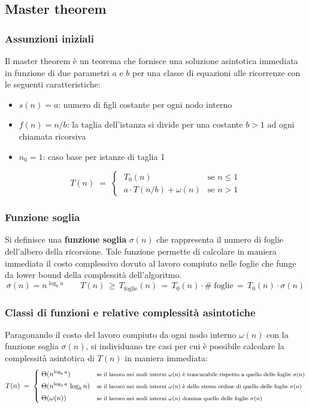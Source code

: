 \subsection{Master theorem}
\subsubsection*{Assunzioni iniziali}
Il master theorem è un teorema che fornisce una soluzione asintotica immediata in funzione di due parametri \(a\) e \(b\)
per una classe di equazioni alle ricorrenze con le seguenti caratteristiche:
\begin{itemize}
	\item \(s(n) = a\): numero di figli costante per ogni nodo interno
	\item \(f(n) = n/b\): la taglia dell'istanza si divide per una costante \(b > 1\) ad ogni chiamata ricorsiva
	\item \(n_0 = 1\): caso base per istanze di taglia 1
\end{itemize}

\[T(n) \; = \; \begin{cases}
	\; T_0(n) & \text{se } n \leq 1 \\[3pt]
	\; a \cdot T(n/b) + \omega(n) & \text{se } n > 1
\end{cases}\]

\subsubsection*{Funzione soglia}
Si definisce una \textbf{funzione soglia} \(\sigma(n)\) che rappresenta il numero di foglie dell'albero della ricorsione.
Tale funzione permette di calcolare in maniera immediata il costo complessivo dovuto al lavoro compiuto nelle foglie che
funge da lower bound della complessità dell'algoritmo.
\[\sigma(n) = n^{\log_b a} \qquad T(n) \, \geq \, T_{\text{foglie}}(n) \, = \, T_0(n) \cdot \# \; \text{foglie} \, = \, T_0(n) \cdot \sigma(n)\]

\subsubsection*{Classi di funzioni e relative complessità asintotiche}
Paragonando il costo del lavoro compiuto da ogni nodo interno \(\omega(n)\) con la funzione soglia \(\sigma(n)\), si
individuano tre casi per cui è possibile calcolare la complessità asintotica di \(T(n)\) in maniera immediata:
\[T(n) \; = \; \begin{cases}
	\; \displaystyle \Theta (n^{\log_b a}) & \text{\footnotesize se il lavoro nei nodi interni \(\omega(n)\) è trascurabile rispetto a quello delle foglie \(\sigma(n)\)} \\[3pt]
	\; \displaystyle \Theta (n^{\log_b a} \, \log_b n) & \text{\footnotesize se il lavoro nei nodi interni \(\omega(n)\) è dello stesso ordine di quello delle foglie \(\sigma(n)\)} \\[3pt]
	\; \displaystyle \Theta (\omega(n)) & \text{\footnotesize se il lavoro nei nodi interni \(\omega(n)\) domina quello delle foglie \(\sigma(n)\)}
\end{cases}\]

